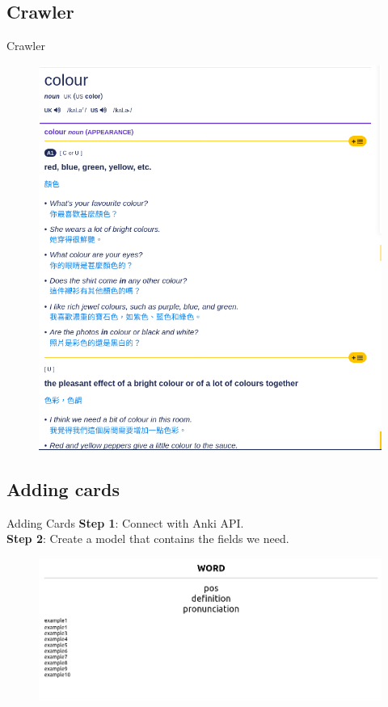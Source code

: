\documentclass{beamer}
\begin{document}
\subsection{Crawler}%

\begin{frame}{Crawler}
	\begin{figure}[h]
		\centering
		\includegraphics[width=0.6\linewidth]{./cambridge.png}
	\end{figure}
\end{frame}


\subsection{Adding cards}%

\begin{frame}{Adding Cards}
	\textbf{Step 1}: Connect with Anki API.\\
	\textbf{Step 2}: Create a model that contains the fields we need.
	\begin{figure}[h]
			\centering
			\includegraphics[width=1.00\linewidth]{./model_example.png}
	\end{figure}
\end{frame}
\end{document}
